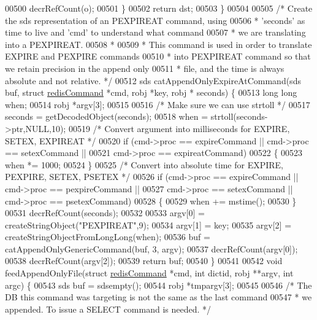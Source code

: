 \begin{DoxyCode}
{{{{{{{00500         decrRefCount(o);
00501     \}
00502     \textcolor{keywordflow}{return} dst;
00503 \}
00504 
00505 \textcolor{comment}{/* Create the sds representation of an PEXPIREAT command, using}
00506 \textcolor{comment}{ * 'seconds' as time to live and 'cmd' to understand what command}
00507 \textcolor{comment}{ * we are translating into a PEXPIREAT.}
00508 \textcolor{comment}{ *}
00509 \textcolor{comment}{ * This command is used in order to translate EXPIRE and PEXPIRE commands}
00510 \textcolor{comment}{ * into PEXPIREAT command so that we retain precision in the append only}
00511 \textcolor{comment}{ * file, and the time is always absolute and not relative. */}
00512 sds catAppendOnlyExpireAtCommand(sds buf, \textcolor{keyword}{struct} \hyperlink{structredisCommand}{redisCommand} *cmd, robj *key, robj *
      seconds) \{
00513     \textcolor{keywordtype}{long} \textcolor{keywordtype}{long} when;
00514     robj *argv[3];
00515 
00516     \textcolor{comment}{/* Make sure we can use strtoll */}
00517     seconds = getDecodedObject(seconds);
00518     when = strtoll(seconds->ptr,NULL,10);
00519     \textcolor{comment}{/* Convert argument into milliseconds for EXPIRE, SETEX, EXPIREAT */}
00520     \textcolor{keywordflow}{if} (cmd->proc == expireCommand || cmd->proc == setexCommand ||
00521         cmd->proc == expireatCommand)
00522     \{
00523         when *= 1000;
00524     \}
00525     \textcolor{comment}{/* Convert into absolute time for EXPIRE, PEXPIRE, SETEX, PSETEX */}
00526     \textcolor{keywordflow}{if} (cmd->proc == expireCommand || cmd->proc == pexpireCommand ||
00527         cmd->proc == setexCommand || cmd->proc == psetexCommand)
00528     \{
00529         when += mstime();
00530     \}
00531     decrRefCount(seconds);
00532 
00533     argv[0] = createStringObject(\textcolor{stringliteral}{"PEXPIREAT"},9);
00534     argv[1] = key;
00535     argv[2] = createStringObjectFromLongLong(when);
00536     buf = catAppendOnlyGenericCommand(buf, 3, argv);
00537     decrRefCount(argv[0]);
00538     decrRefCount(argv[2]);
00539     \textcolor{keywordflow}{return} buf;
00540 \}
00541 
00542 \textcolor{keywordtype}{void} feedAppendOnlyFile(\textcolor{keyword}{struct} \hyperlink{structredisCommand}{redisCommand} *cmd, \textcolor{keywordtype}{int} dictid, robj **argv, \textcolor{keywordtype}{int} argc) \{
00543     sds buf = sdsempty();
00544     robj *tmpargv[3];
00545 
00546     \textcolor{comment}{/* The DB this command was targeting is not the same as the last command}
00547 \textcolor{comment}{     * we appended. To issue a SELECT command is needed. */}
}}}}}}}
\end{DoxyCode}

